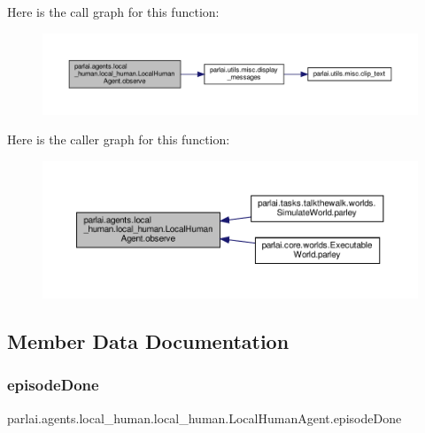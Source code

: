 Here is the call graph for this function\+:
\nopagebreak
\begin{figure}[H]
\begin{center}
\leavevmode
\includegraphics[width=350pt]{classparlai_1_1agents_1_1local__human_1_1local__human_1_1LocalHumanAgent_aa204d28672d6580895d95aed167cb129_cgraph}
\end{center}
\end{figure}
Here is the caller graph for this function\+:
\nopagebreak
\begin{figure}[H]
\begin{center}
\leavevmode
\includegraphics[width=350pt]{classparlai_1_1agents_1_1local__human_1_1local__human_1_1LocalHumanAgent_aa204d28672d6580895d95aed167cb129_icgraph}
\end{center}
\end{figure}


\subsection{Member Data Documentation}
\mbox{\label{classparlai_1_1agents_1_1local__human_1_1local__human_1_1LocalHumanAgent_abbcf0b2948c89b6c42a10ef1c81457ce}} 
\subsubsection{\texorpdfstring{episode\+Done}{episodeDone}}
{\footnotesize\ttfamily parlai.\+agents.\+local\+\_\+human.\+local\+\_\+human.\+Local\+Human\+Agent.\+episode\+Done}



